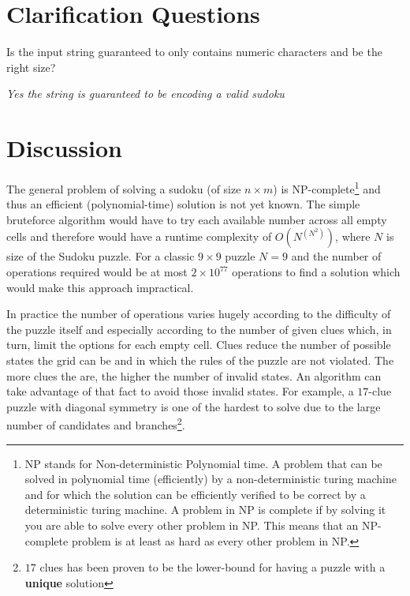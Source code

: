 \section{Clarification Questions}

\begin{QandA}
	\item \begin{questionitem} \begin{question} Is the input string guaranteed to only contains numeric characters and be the right size?  \end{question} 	 
    \begin{answered}
		\textit{Yes the string is guaranteed to be encoding a valid sudoku}
	\end{answered} \end{questionitem}	
\end{QandA}

\section{Discussion}
\label{sudoku:sec:discussion}
The general problem of solving a sudoku (of size $n\times m$) is NP-complete\footnote{NP stands for
Non-deterministic Polynomial time. A problem that can be solved in polynomial time (efficiently) by
a non-deterministic turing machine and for which the solution can be efficiently verified to be
correct by a deterministic turing machine. A problem in NP is complete if by solving it you are able
to solve every other problem in NP. This means that an NP-complete problem is at least as hard as
every other problem in NP.} and thus an efficient (polynomial-time) solution is not yet known. The
simple bruteforce algorithm would have to try each available number across all empty cells and
therefore would have a runtime complexity of $O(N^{(N^2)})$, where $N$ is size of the Sudoku puzzle.
For a classic  $9 \times 9$ puzzle $N = 9$ and the number of operations required would be at most $2
\times 10^{77}$ operations to find a solution which would make this approach
impractical. 

In practice the number of operations varies hugely according to the difficulty of the puzzle itself
and especially according to the number of given clues which, in turn, limit the options for each empty
cell. Clues reduce the number of possible states the grid can be  and in which the rules of the
puzzle are not violated. The more clues the are, the higher the number of invalid states. An algorithm can take
advantage of that fact to avoid those invalid states. For example, a $17$-clue puzzle with diagonal symmetry is
one of the hardest to solve due to the large number of candidates and branches\footnote{$17$ clues
has been proven to be the lower-bound for having a puzzle with a \textbf{unique} solution}. 

